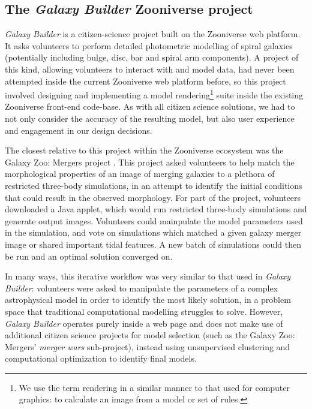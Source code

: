 \documentclass[../main.tex]{subfiles}
\begin{document}
\label{sec:method}

\subsection{The \textit{Galaxy Builder} Zooniverse project}

\textit{Galaxy Builder} is a citizen-science project built on the Zooniverse web platform. It asks volunteers to perform detailed photometric modelling of spiral galaxies (potentially including bulge, disc, bar and spiral arm components). A project of this kind, allowing volunteers to interact with and model data, had never been attempted inside the current Zooniverse web platform before, so this project involved designing and implementing a model rendering\footnote{We use the term rendering in a similar manner to that used for computer graphics: to calculate an image from a model or set of rules.} suite inside the existing Zooniverse front-end code-base. As with all citizen science solutions, we had to not only consider the accuracy of the resulting model, but also user experience and engagement in our design decisions.

The closest relative to this project within the Zooniverse ecosystem was the Galaxy Zoo: Mergers project \citep{Holincheck2016:1604.00435v1}. This project asked volunteers to help match the morphological properties of an image of merging galaxies to a plethora of restricted three-body simulations, in an attempt to identify the initial conditions that could result in the observed morphology. For part of the project, volunteers downloaded a Java applet, which would run restricted three-body simulations and generate output images. Volunteers could mainpulate the model parameters used in the simulation, and vote on simulations which matched a given galaxy merger image or shared important tidal features. A new batch of simulations could then be run and an optimal solution converged on.

In many ways, this iterative workflow was very similar to that used in \textit{Galaxy Builder}: volunteers were asked to manipulate the parameters of a complex astrophysical model in order to identify the most likely solution, in a problem space that traditional computational modelling struggles to solve. However, \textit{Galaxy Builder} operates purely inside a web page and does not make use of additional citizen science projects for model selection (such as the Galaxy Zoo: Mergers' \textit{merger wars} sub-project), instead using unsupervised clustering and computational optimization to identify final models.
\end{document}
